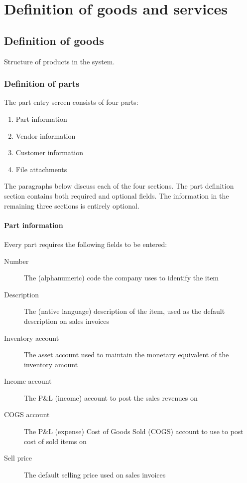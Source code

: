 \chapter{Definition of goods and services}
\label{cha-products-definition}


\section{Definition of goods}
\label{sec-products-definition-goods}

Structure of products in the system.

\subsection{Definition of parts}
\label{subsec-products-parts-definition}

The part entry screen consists of four parts:

\begin{enumerate}
\item Part information
\item Vendor information
\item Customer information
\item File attachments
\end{enumerate}


The paragraphs below discuss each of the four sections. The part definition section
contains both required and optional fields. The information in the remaining
three sections is entirely optional.

\subsubsection{Part information}
\label{subsubsec-parts-information}

Every part requires the following fields to be entered:

\begin{description}
\item [Number] The (alphanumeric) code the company uses to identify the item
\item [Description] The (native language) description of the item, used as the default
        description on sales invoices
\item [Inventory account] The asset account used to maintain the monetary equivalent
        of the inventory amount
\item [Income account] The P\&L (income) account to post the sales revenues on
\item [COGS account] The P\&L (expense) Cost of Goods Sold (COGS) account to use
        to post cost of sold items on
\item [Sell price] The default selling price used on sales invoices
\end{description}


